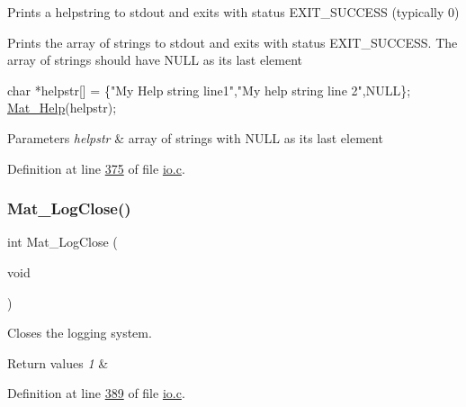 Prints a helpstring to stdout and exits with status E\+X\+I\+T\+\_\+\+S\+U\+C\+C\+E\+SS (typically 0) 

Prints the array of strings to stdout and exits with status E\+X\+I\+T\+\_\+\+S\+U\+C\+C\+E\+SS. The array of strings should have N\+U\+LL as its last element 
\begin{DoxyCode}
\textcolor{keywordtype}{char} *helpstr[] = \{\textcolor{stringliteral}{"My Help string line1"},\textcolor{stringliteral}{"My help string line 2"},NULL\};
\hyperlink{group__mat__util_gaa4039c185e807ed2e9682b66fe2ea331}{Mat\_Help}(helpstr);
\end{DoxyCode}



\begin{DoxyParams}{Parameters}
{\em helpstr} & array of strings with N\+U\+LL as its last element \\
\hline
\end{DoxyParams}


Definition at line \hyperlink{io_8c_source_l00375}{375} of file \hyperlink{io_8c_source}{io.\+c}.

\mbox{\label{group__mat__util_ga333d15dbd2e7a691621a2af8fc7adc3d}} 
\subsubsection{\texorpdfstring{Mat\+\_\+\+Log\+Close()}{Mat\_LogClose()}}
{\footnotesize\ttfamily int Mat\+\_\+\+Log\+Close (\begin{DoxyParamCaption}\item[{void}]{ }\end{DoxyParamCaption})}



Closes the logging system. 


\begin{DoxyRetVals}{Return values}
{\em 1} & \\
\hline
\end{DoxyRetVals}


Definition at line \hyperlink{io_8c_source_l00389}{389} of file \hyperlink{io_8c_source}{io.\+c}.

\mbox{\label{group__mat__util_ga0d30e03216ceaab7c0a4ff878b26f89f}} 
